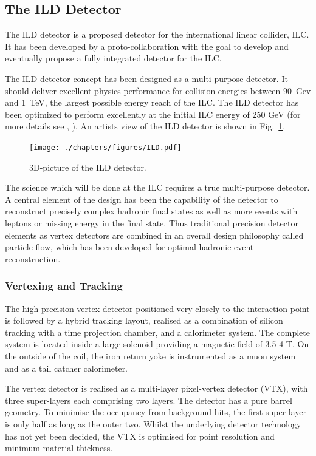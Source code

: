 \subsection{The ILD Detector}
The ILD detector is a proposed detector for the international linear collider, ILC. It has been developed by a proto-collaboration with the goal to develop and eventually propose a fully integrated detector for the ILC. 

The ILD detector concept has been designed as a multi-purpose detector. It should deliver excellent physics performance for collision energies between 90~Gev and 1~TeV, the largest possible energy reach of the ILC. The ILD detector has been optimized to perform excellently at the initial ILC energy of 250 GeV (for more details see \cite{ild:bib:ILDloi}, \cite{ild:bib:ILDDBD}). An artists view of the ILD detector is shown in Fig.~\ref{fig:ild_3d}. 
\begin{figure}
    \centering
    \texttt{[image: ./chapters/figures/ILD.pdf]}
    \caption{3D-picture of the ILD detector.}
    \label{fig:ild_3d}
\end{figure}

The science which will be done at the ILC requires a true multi-purpose detector. A central element of the design has been the capability of the detector to reconstruct precisely complex hadronic final states as well as more events with leptons or missing energy in the final state. Thus traditional precision detector elements as vertex detectors are combined in an overall design philosophy called particle flow, which has been developed for optimal hadronic event reconstruction.

\subsubsection{Vertexing and Tracking}
The high precision vertex detector positioned very closely to the interaction point is followed by a hybrid tracking layout, realised as a combination of silicon tracking with a time projection chamber, and a calorimeter system. The complete system is located inside a large solenoid providing a magnetic field of 3.5-4 T. On the outside of the coil, the iron return yoke is instrumented as a muon system and as a tail catcher calorimeter. 

The vertex detector is realised as a multi-layer pixel-vertex detector (VTX), with three super-layers each comprising two layers. The detector has a pure barrel geometry. To minimise the occupancy from background hits,
the first super-layer is only half as long as the outer two. Whilst the underlying detector technology has not yet been decided, 
the VTX is optimised for point resolution and minimum material thickness. 
	
